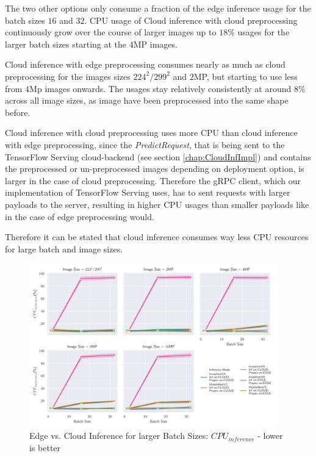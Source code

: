 The two other options only consume a fraction of the edge inference usage for the batch sizes $16$ and $32$.
CPU usage of Cloud inference with cloud preprocessing continuously grow over the course of larger images up to $18\%$ usages for the larger batch sizes starting at the $4$MP images.

Cloud inference with edge preprocessing consumes nearly as much as cloud preprocessing for the images sizes $224^2/299^2$ and $2$MP, but starting to use less from $4$Mp images onwards.
The usages stay relatively consistently at around $8\%$ across all image sizes, as image have been preprocessed into the same shape before.

Cloud inference with cloud preprocessing uses more CPU than cloud inference with edge preprocessing, since the \emph{PredictRequest}, that is being sent to the TensorFlow Serving cloud-backend (see section \ref{chap:CloudInfImpl}) and contains the preprocessed or un-preprocessed images depending on deployment option, is larger in the case of cloud preprocessing.
Therefore the gRPC client, which our implementation of TensorFlow Serving uses, has to sent requests with larger payloads to the server, resulting in higher CPU usages than smaller payloads like in the case of edge preprocessing would.


Therefore it can be stated that cloud inference consumes way less CPU resources for large batch and image sizes.

\begin{figure}[!htb]
\centering
\includegraphics[width=0.95\textwidth]{./Bilder/single_plots/batch_size_plots/Effects_of_Batch_size_Inference_CPU_Usage.pdf}
\caption{Edge vs. Cloud Inference for larger Batch Sizes:  $CPU_{inference}$ - lower is better}
\label{fig:BatchSizeInferenceCPU}
\end{figure}

